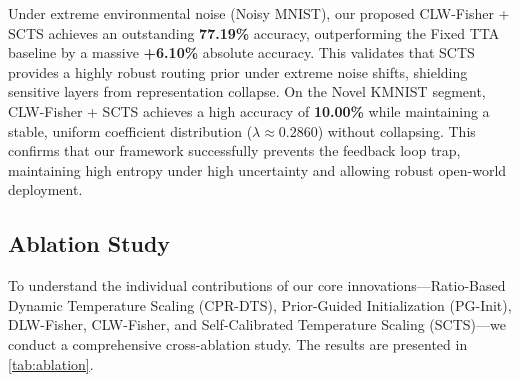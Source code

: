 \documentclass{article}
\theoremstyle{plain}
\theoremstyle{definition}
\theoremstyle{remark}
\begin{document}
Under extreme environmental noise (Noisy MNIST), our proposed CLW-Fisher + SCTS achieves an outstanding \textbf{77.19\%} accuracy, outperforming the Fixed TTA baseline by a massive \textbf{+6.10\%} absolute accuracy. This validates that SCTS provides a highly robust routing prior under extreme noise shifts, shielding sensitive layers from representation collapse. On the Novel KMNIST segment, CLW-Fisher + SCTS achieves a high accuracy of \textbf{10.00\%} while maintaining a stable, uniform coefficient distribution ($\lambda \approx 0.2860$) without collapsing. This confirms that our framework successfully prevents the feedback loop trap, maintaining high entropy under high uncertainty and allowing robust open-world deployment.

\subsection{Ablation Study}
To understand the individual contributions of our core innovations—Ratio-Based Dynamic Temperature Scaling (CPR-DTS), Prior-Guided Initialization (PG-Init), DLW-Fisher, CLW-Fisher, and Self-Calibrated Temperature Scaling (SCTS)—we conduct a comprehensive cross-ablation study. The results are presented in \cref{tab:ablation}.

\begin{table}[t]
  \centering
  \caption{Ablation study showing classification accuracy across different stream segments. Comparing Fixed vs. CPR-DTS temperature scaling and Reset-to-0.5 vs. Prior-Guided (PG) Parameter Initialization against our full DLW-Fisher, CLW-Fisher, and SCTS/TS-SCTS frameworks.}
  \label{tab:ablation}
  \vskip 0.15in
  \begin{small}
    \scshape
  \end{small}
  \vskip -0.1in
\end{table}
\end{document}
